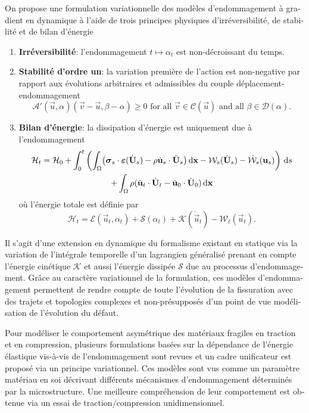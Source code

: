 \begin{otherlanguage}{french}
On propose une formulation variationnelle des modèles d'endommagement à gradient en dynamique à l'aide de trois principes physiques d'irréversibilité, de stabilité et de bilan d'énergie
\begin{enumerate}
\item \textbf{Irréversibilité}: l'endommagement $t\mapsto\alpha_t$ est non-décroissant du temps.
\item \textbf{Stabilité d'ordre un}: la variation première de l'action est non-negative par rapport aux évolutions arbitraires et admissibles du couple déplacement-endommagement
\begin{equation*}
\mathcal{A}'(\vec{u},\alpha)(\vec{v}-\vec{u},\beta-\alpha)\geq 0\text{ for all $\vec{v}\in\mathcal{C}(\vec{u})$ and all $\beta\in\mathcal{D}(\alpha)$}.
\end{equation*}
\item \textbf{Bilan d'énergie}: la dissipation d'énergie est uniquement due à l'endommagement
\begin{multline*}
\mathcal{H}_t=\mathcal{H}_0+\int_0^t\left(\int_\Omega\bigl(\sig_s\cdot\eps(\dot{\vec{U}}_s)-\rho\dot{\vec{u}}_s\cdot\ddot{\vec{U}}_s\bigr)\dx-\mathcal{W}_s(\dot{\vec{U}}_s)-\dot{\mathcal{W}}_s(\vec{u}_s)\right)\D{s} \\
+\int_\Omega\rho(\dot{\vec{u}}_t\cdot\dot{\vec{U}}_t-\dot{\vec{u}}_0\cdot\dot{\vec{U}}_0)\dx
\end{multline*}
où l'énergie totale est définie par
\[
\mathcal{H}_t=\mathcal{E}(\vec{u}_t,\alpha_t)+\mathcal{S}(\alpha_t)+\mathcal{K}(\dot{\vec{u}}_t)-\mathcal{W}_t(\vec{u}_t).
\]
\end{enumerate}
Il s'agit d'une extension en dynamique du formalisme existant en statique via la variation de l'intégrale temporelle d'un lagrangien généralisé prenant en compte l'énergie cinétique $\mathcal{K}$ et aussi l'énergie dissipée $\mathcal{S}$ due au processus d'endommagement. Grâce au caractère variationnel de la formulation, ces modèles d'endommagement permettent de rendre compte de toute l'évolution de la fissuration avec des trajets et topologies complexes et non-présupposés d'un point de vue modélisation de l'évolution du défaut.

Pour modéliser le comportement asymétrique des matériaux fragiles en traction et en compression, plusieurs formulations basées sur la dépendance de l'énergie élastique vis-à-vis de l'endommagement sont revues et un cadre unificateur est proposé via un principe variationnel. Ces modèles sont vus comme un paramètre matériau en soi décrivant différents mécanismes d'endommagement déterminés par la microstructure. Une meilleure compréhension de leur comportement est obtenue via un essai de traction/compression unidimensionnel.


\end{otherlanguage}
